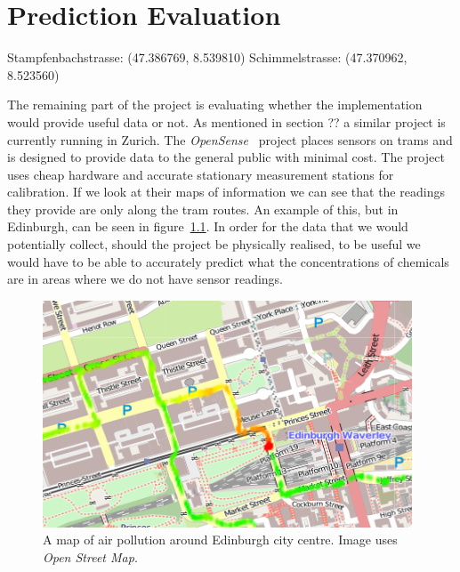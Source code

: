 \chapter{Prediction Evaluation}\label{prediction_evaluation}
	
	


	Stampfenbachstrasse: (47.386769, 8.539810)
	Schimmelstrasse: (47.370962, 8.523560)

	The remaining part of the project is evaluating whether the implementation would provide useful data or not. As mentioned in section ?? a similar project is currently running in Zurich. The \emph{OpenSense}~\cite{opensensezurich} project places sensors on trams and is designed to provide data to the general public with minimal cost. The project uses cheap hardware and accurate stationary measurement stations for calibration. If we look at their maps of information we can see that the readings they provide are only along the tram routes. An example of this, but in Edinburgh, can be seen in figure~\ref{fig:stationarypollutantbuildup}. In order for the data that we would potentially collect, should the project be physically realised, to be useful we would have to be able to accurately predict what the concentrations of chemicals are in areas where we do not have sensor readings. 

	\begin{figure}[H]
	    \begin{center}
	        \includegraphics[width=\textwidth]{./images/StationaryPollutantBuildUp.png}
	        \caption{A map of air pollution around Edinburgh city centre. Image uses \emph{Open Street Map}.}
	        \label{fig:stationarypollutantbuildup}
	    \end{center}
	\end{figure}

